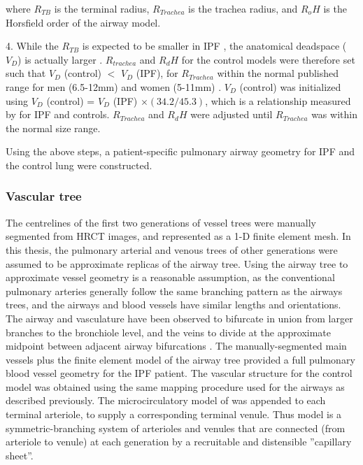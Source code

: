 \noindent where $R_{TB}$ is the terminal radius, $R_{Trachea}$ is the trachea radius, and $R_oH$ is the Horsfield order of the airway model.

4. While the $R_{TB}$ is expected to be smaller in IPF \citep{crystal1976idiopathic}, the anatomical deadspace ($V_D$) is actually larger \citep{plantier2016increased}. $R_{trachea}$ and $R_dH$ for the control models were therefore set such that $V_D$ (control) $<$ $V_D$ (IPF), for $R_{Trachea}$ within the normal published range for men (6.5-12mm) and women (5-11mm) \citep{breatnach1984dimensions}. $V_D$ (control) was initialized using $V_D$ (control) = $V_D$ (IPF) $\times (34.2/45.3)$, which is a relationship measured by \cite{plantier2016increased} for IPF and controls. $R_{Trachea}$ and $R_dH$ were adjusted until $R_{Trachea}$ was within the normal size range.

Using the above steps, a patient-specific pulmonary airway geometry for IPF and the control lung were constructed. 

\subsubsection{Vascular tree}
The centrelines of the first two generations of vessel trees were manually segmented from HRCT images, and represented as a 1-D finite element mesh. In this thesis, the pulmonary arterial and venous trees of other generations were assumed to be approximate replicas of the airway tree. Using the airway tree to approximate vessel geometry is a reasonable assumption, as the conventional pulmonary arteries generally follow the same branching pattern as the airways trees, and the airways and blood vessels have similar lengths and orientations. The airway and vasculature have been observed to bifurcate in union from larger branches to the bronchiole level, and the veins to divide at the approximate midpoint between adjacent airway bifurcations \citep{weibel1984pathway, hsia2016lung}. The manually-segmented main vessels plus the finite element model of the airway tree provided a full pulmonary blood vessel geometry for the IPF patient. The vascular structure for the control model was obtained using the same mapping procedure used for the airways as described previously. The microcirculatory model of \cite{clark2010contribution,clark2011interdependent} was appended to each terminal arteriole, to supply a corresponding terminal venule. Thus model is a symmetric-branching system of arterioles and venules that are connected (from arteriole to venule) at each generation by a recruitable and distensible ''capillary sheet''.

